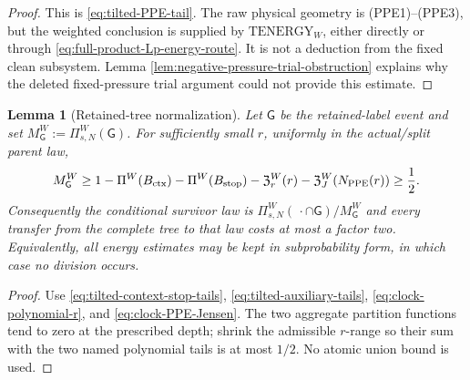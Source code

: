 \documentclass[11pt]{article}
\newtheorem{lemma}[theorem]{Lemma}
\begin{document}
\begin{proof}
This is \eqref{eq:tilted-PPE-tail}.  The raw physical geometry is
\textup{(PPE1)--(PPE3)}, but the weighted conclusion is supplied by
$\mathrm{TENERGY}_{W}$, either directly or through
\eqref{eq:full-product-Lp-energy-route}.  It is not a deduction from the
fixed clean subsystem.  Lemma
\ref{lem:negative-pressure-trial-obstruction} explains why the deleted
fixed-pressure trial argument could not provide this estimate.
\end{proof}

\begin{lemma}[Retained-tree normalization]
\label{lem:retained-tree-normalization}
Let $\mathsf G$ be the retained-label event and set
$M_{\mathsf G}^{W}:=\Pi_{s,N}^{W}(\mathsf G)$.  For sufficiently small $r$,
uniformly in the actual/split parent law,
\begin{equation}
\label{eq:survivor-mass-lower-bound}
 M_{\mathsf G}^{W}\ge
 1-\Pi^W(B_{\rm ctx})-\Pi^W(B_{\rm stop})
   -\mathfrak Z_r^W(r)-\mathfrak Z_J^W(N_{\rm PPE}(r))
 \ge\frac12.
\end{equation}
Consequently the conditional survivor law is
$\Pi_{s,N}^{W}(\,\cdot\cap\mathsf G)/M_{\mathsf G}^{W}$ and every transfer
from the complete tree to that law costs at most a factor two.  Equivalently,
all energy estimates may be kept in subprobability form, in which case no
division occurs.
\end{lemma}

\begin{proof}
Use \eqref{eq:tilted-context-stop-tails},
\eqref{eq:tilted-auxiliary-tails}, \eqref{eq:clock-polynomial-r}, and
\eqref{eq:clock-PPE-Jensen}.  The two aggregate partition functions tend to
zero at the prescribed depth; shrink the admissible $r$-range so their sum
with the two named polynomial tails is at most $1/2$.  No atomic union bound
is used.
\end{proof}
\end{document}
